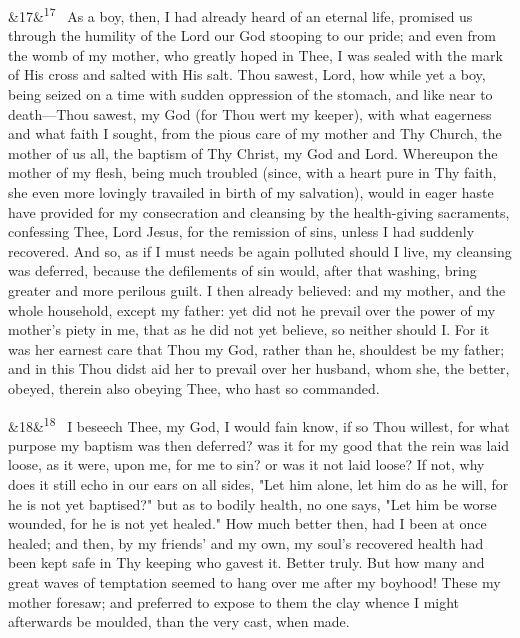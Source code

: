 \documentclass[12pt]{article}
\newcommand{\para}[1][]{\par\noindent\ifx&#1&\else\textsuperscript{\footnotesize #1}~\fi}
\begin{document}
\para[17] As a boy, then, I had already heard of an eternal life, promised us through the humility of the Lord our God stooping to our pride; and even from the womb of my mother, who greatly hoped in Thee, I was sealed with the mark of His cross and salted with His salt. Thou sawest, Lord, how while yet a boy, being seized on a time with sudden oppression of the stomach, and like near to death---Thou sawest, my God (for Thou wert my keeper), with what eagerness and what faith I sought, from the pious care of my mother and Thy Church, the mother of us all, the baptism of Thy Christ, my God and Lord. Whereupon the mother of my flesh, being much troubled (since, with a heart pure in Thy faith, she even more lovingly travailed in birth of my salvation), would in eager haste have provided for my consecration and cleansing by the health-giving sacraments, confessing Thee, Lord Jesus, for the remission of sins, unless I had suddenly recovered. And so, as if I must needs be again polluted should I live, my cleansing was deferred, because the defilements of sin would, after that washing, bring greater and more perilous guilt. I then already believed: and my mother, and the whole household, except my father: yet did not he prevail over the power of my mother's piety in me, that as he did not yet believe, so neither should I. For it was her earnest care that Thou my God, rather than he, shouldest be my father; and in this Thou didst aid her to prevail over her husband, whom she, the better, obeyed, therein also obeying Thee, who hast so commanded.

\para[18] I beseech Thee, my God, I would fain know, if so Thou willest, for what purpose my baptism was then deferred? was it for my good that the rein was laid loose, as it were, upon me, for me to sin? or was it not laid loose? If not, why does it still echo in our ears on all sides, "Let him alone, let him do as he will, for he is not yet baptised?" but as to bodily health, no one says, "Let him be worse wounded, for he is not yet healed." How much better then, had I been at once healed; and then, by my friends' and my own, my soul's recovered health had been kept safe in Thy keeping who gavest it. Better truly. But how many and great waves of temptation seemed to hang over me after my boyhood! These my mother foresaw; and preferred to expose to them the clay whence I might afterwards be moulded, than the very cast, when made.
\end{document}
